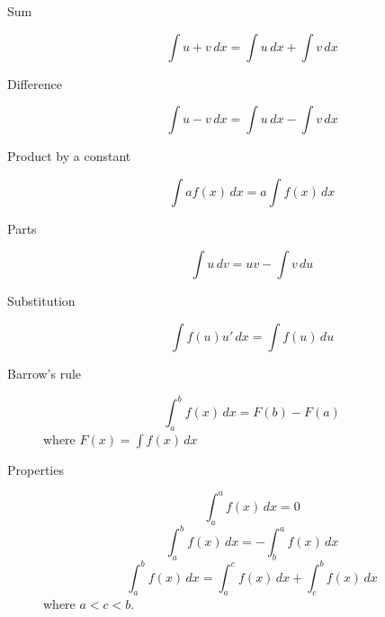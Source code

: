 \begin{multicols}{2}
\begin{tcolorbox}[hbox, title=Integration rules]
  \begin{minipage}{0.4\textwidth}
    \begin{description}
      \item[Sum]
      \[
        \int u+v\,dx = \int u\,dx + \int v\,dx
      \]
      \item[Difference]
      \[
        \int u-v\,dx = \int u\,dx - \int v\,dx
      \]
      \item[Product by a constant]
      \[
        \int af(x)\,dx = a\int f(x)\,dx
      \]
      \item[Parts]
      \[
        \int u\,dv = uv - \int v\,du
      \]
      \item[Substitution]
      \[
        \int f(u)u'\,dx = \int f(u)\,du
      \]
    \end{description}
  \end{minipage}
\end{tcolorbox}

\begin{tcolorbox}[hbox, title=Definite integrals]
  \begin{minipage}{0.4\textwidth}
    \begin{description}
      \item[Barrow's rule]
      \[
        \int_a^b f(x)\,dx = F(b)-F(a)
      \]
      where $F(x) = \int f(x)\,dx$
      \begin{center}
      
      \end{center}
      \item[Properties]
      \[
        \int_a^a f(x)\,dx = 0
      \]
      \[
        \int_a^b f(x)\,dx = -\int_b^a f(x)\,dx
      \]
      \[
        \int_a^b f(x)\, dx = \int_a^c f(x)\,dx + \int_c^b f(x)\,dx
      \]
      where $a<c<b$.
    \end{description}
  \end{minipage}
\end{tcolorbox}
\end{multicols}